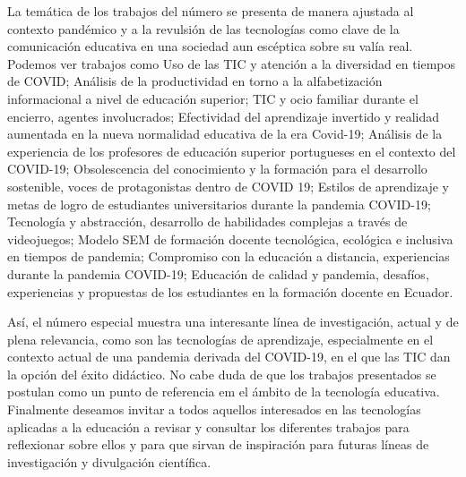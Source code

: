 \documentclass{textolivre}
\begin{document}
La temática de los trabajos del número se presenta de manera ajustada al contexto pandémico y a la revulsión de las tecnologías como clave de la comunicación educativa en una sociedad aun escéptica sobre su valía real. Podemos ver trabajos como Uso de las TIC y atención a la diversidad en tiempos de COVID; Análisis de la productividad en torno a la alfabetización informacional a nivel de educación superior; TIC y ocio familiar durante el encierro, agentes involucrados; Efectividad del aprendizaje invertido y realidad aumentada en la nueva normalidad educativa de la era Covid-19; Análisis de la experiencia de los profesores de educación superior portugueses en el contexto del COVID-19; Obsolescencia del conocimiento y la formación para el desarrollo sostenible, voces de protagonistas dentro de COVID 19; Estilos de aprendizaje y metas de logro de estudiantes universitarios durante la pandemia COVID-19; Tecnología y abstracción, desarrollo de habilidades complejas a través de videojuegos; Modelo SEM de formación docente tecnológica, ecológica e inclusiva en tiempos de pandemia; Compromiso con la educación a distancia, experiencias durante la pandemia COVID-19; Educación de calidad y pandemia, desafíos, experiencias y propuestas de los estudiantes en la formación docente en Ecuador. 

Así, el número especial muestra una interesante línea de investigación, actual y de plena relevancia, como son las tecnologías de aprendizaje, especialmente en el contexto actual de una pandemia derivada del COVID-19, en el que las TIC dan la opción del éxito didáctico. No cabe duda de que los trabajos presentados se postulan como un punto de referencia em el ámbito de la tecnología educativa. Finalmente deseamos invitar a todos aquellos interesados en las tecnologías aplicadas a la educación a revisar y consultar los diferentes trabajos para reflexionar sobre ellos y para que sirvan de inspiración para futuras líneas de investigación y divulgación científica.

\printbibliography\label{sec-bib}
\end{document}
